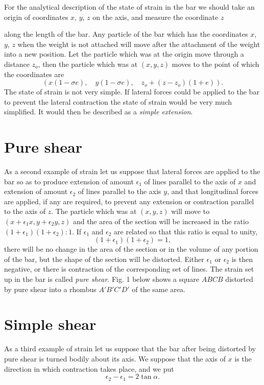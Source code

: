 For the analytical description of the state of strain in the bar we should 
take an origin of coordinates \(x\), \(y\), \(z\) on the axis, and measure the
coordinate \(z\)

along the length of the bar. Any particle of the bar which has the coordinates
\(x\), \(y\), \(z\)
when the weight is not attached will move after the attachment 
of the weight into a new position. Let the particle which was at the origin 
move through a distance
\(z_o\), then the particle which was at
\((x,y,z)\)
moves to 
the point of which the coordinates are 
\[
(x(1-\sigma e), \quad y(1-\sigma e), \quad z_o + (z-z_o) (1+ e)).
\]
The state of strain is not very simple. If lateral forces could be applied to 
the bar to prevent the lateral contraction the state of strain would be very 
much simplified. It would then be described as a \textit{simple extension}. 

\section{Pure  shear}
As a second example of strain let us suppose that lateral forces are applied 
to the bar so as to produce extension of amount
\(\epsilon_1\) of lines parallel to the axis of \(x\) and
extension of amount \(\epsilon_2\) of lines parallel to the axis \(y\), and that 
longitudinal forces are applied, if any are required, to prevent any extension 
or contraction parallel to the axis of \(z\). The particle which was at
\((x, y, z)\) will move to \((x+\epsilon_1 x,y+\epsilon_2 y, z)\)
and the area of the section will be increased in the ratio
\((1+\epsilon_1)(1+\epsilon_2):1\).
If \(\epsilon_1\) and \(\epsilon_2\)
are related so that this ratio is equal to unity,
\[
(1+\epsilon_1)(1+\epsilon_2)=1,
\]
there will be no change in the area of the section or in the volume of any
portion of the bar, but the shape of the section will be distorted.  Either
\(\epsilon_1\) or \(\epsilon_2\) is then negative, or there is contraction of
the corresponding set of lines.  The strain set up in the bar is called
\textit{pure shear}.  Fig. 1 below shows a square \(ABCB\) distorted by pure
shear into a rhombus \(A'B'C'D'\) of the same area. 

\section{Simple shear}
As a third example of strain let us suppose that the bar after being distorted
by pure shear is turned bodily about its axis. We suppose that the axis of
\(x\) is the direction in which contraction takes place, and we put 
\[
\epsilon_2 - \epsilon_1 = 2 \tan \alpha.
\]

